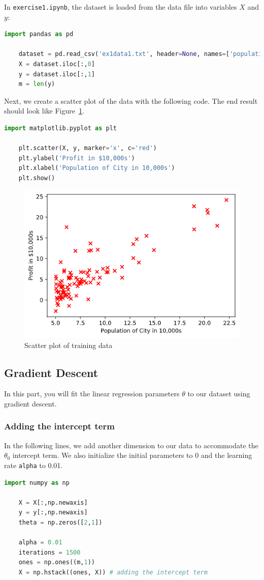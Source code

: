 \documentclass{article}
\begin{document}
In \texttt{exercise1.ipynb}, the dataset is loaded from the data file into variables $X$ and $y$:
\begin{lstlisting}[language=Python]
    import pandas as pd 

    dataset = pd.read_csv('ex1data1.txt', header=None, names=['population', 'profit'])
    X = dataset.iloc[:,0]
    y = dataset.iloc[:,1]
    m = len(y)
\end{lstlisting}

Next, we create a scatter plot of the data with the following code. The end result should look like Figure~\ref{fig:scatter1}.

\begin{lstlisting}[language=Python]
    import matplotlib.pyplot as plt

    plt.scatter(X, y, marker='x', c='red')
    plt.ylabel('Profit in $10,000s')
    plt.xlabel('Population of City in 10,000s')
    plt.show()
\end{lstlisting}

\begin{figure}[h!]
  \centering
  \includegraphics[scale=0.6]{scatter1.png}
  \caption{Scatter plot of training data}
  \label{fig:scatter1}
\end{figure}

\subsection{Gradient Descent}
In this part, you will fit the linear regression parameters $\theta$ to our dataset using gradient descent.
\subsubsection{Adding the intercept term}
In the following lines, we add another dimension to our data to accommodate the $\theta_0$ intercept term. We also initialize the initial parameters to 0 and the learning rate \texttt{alpha} to 0.01.
\begin{lstlisting}[language=Python]
    import numpy as np
    
    X = X[:,np.newaxis]
    y = y[:,np.newaxis]
    theta = np.zeros([2,1])

    alpha = 0.01
    iterations = 1500
    ones = np.ones((m,1))
    X = np.hstack((ones, X)) # adding the intercept term
\end{lstlisting}
\end{document}
